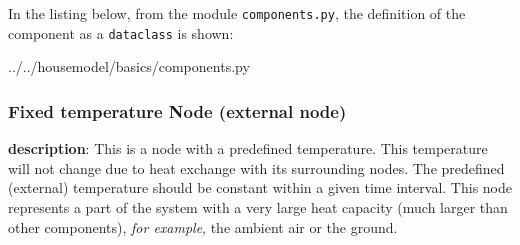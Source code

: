 In the listing below, from the module \texttt{components.py}, the definition of the component as a \texttt{dataclass} is shown: 
\begin{minipage}{\linewidth}

{../../housemodel/basics/components.py}
\end{minipage}

\subsubsection{Fixed temperature Node (external node)}
\textbf{description}: This is a node with a predefined temperature. This temperature will not change due to heat exchange with its surrounding nodes. The predefined (external) temperature should be constant within a given time interval. This node represents a part of the system with a very large heat capacity (much larger than other components), \textit{for example}, the ambient air or the ground. 

